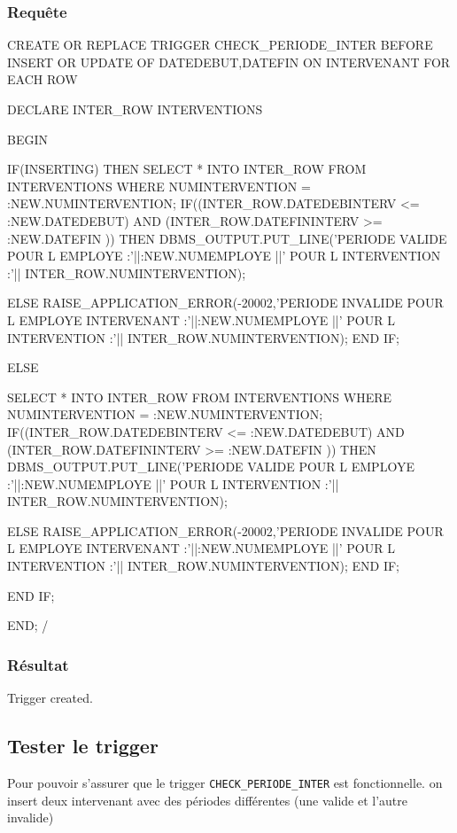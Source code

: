 \documentclass[•]{article}
\begin{document}
\subsubsection{Requête}
\begin{sql}
CREATE OR REPLACE TRIGGER CHECK_PERIODE_INTER 
BEFORE INSERT OR UPDATE OF DATEDEBUT,DATEFIN ON INTERVENANT
FOR EACH ROW

DECLARE
INTER_ROW INTERVENTIONS%

BEGIN

IF(INSERTING) THEN
  SELECT * INTO INTER_ROW FROM INTERVENTIONS WHERE NUMINTERVENTION = :NEW.NUMINTERVENTION;
  IF((INTER_ROW.DATEDEBINTERV <= :NEW.DATEDEBUT) AND (INTER_ROW.DATEFININTERV >= :NEW.DATEFIN ))
	THEN
		DBMS_OUTPUT.PUT_LINE('PERIODE VALIDE POUR L EMPLOYE :'||:NEW.NUMEMPLOYE ||'  POUR L INTERVENTION :'|| INTER_ROW.NUMINTERVENTION);
	
	ELSE RAISE_APPLICATION_ERROR(-20002,'PERIODE INVALIDE POUR L EMPLOYE INTERVENANT :'||:NEW.NUMEMPLOYE ||'  POUR L INTERVENTION :'|| INTER_ROW.NUMINTERVENTION);
  END IF;
  
  ELSE
  
    SELECT * INTO INTER_ROW FROM INTERVENTIONS WHERE NUMINTERVENTION = :NEW.NUMINTERVENTION;
  IF((INTER_ROW.DATEDEBINTERV <= :NEW.DATEDEBUT) AND (INTER_ROW.DATEFININTERV >= :NEW.DATEFIN ))
	THEN
		DBMS_OUTPUT.PUT_LINE('PERIODE VALIDE POUR L EMPLOYE :'||:NEW.NUMEMPLOYE ||'  POUR L INTERVENTION :'|| INTER_ROW.NUMINTERVENTION);
	
	ELSE RAISE_APPLICATION_ERROR(-20002,'PERIODE INVALIDE POUR L EMPLOYE INTERVENANT :'||:NEW.NUMEMPLOYE ||'  POUR L INTERVENTION :'|| INTER_ROW.NUMINTERVENTION);
  END IF;
  
  
  END IF;

END;
/
\end{sql}

\subsubsection{Résultat}
\begin{sql}
Trigger created.
\end{sql}

\subsection{Tester le trigger}
Pour pouvoir s'assurer que le trigger \texttt{CHECK\_PERIODE\_INTER} est fonctionnelle. on insert deux intervenant avec des périodes différentes (une valide et l'autre invalide)
\end{document}
